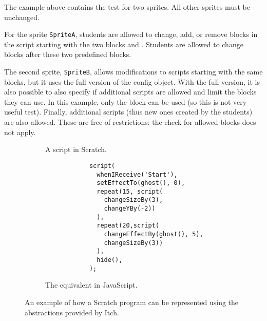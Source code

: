 \documentclass[../main]{subfiles}
\begin{document}
The example above contains the test for two sprites.
All other sprites must be unchanged.

For the sprite \texttt{SpriteA}, students are allowed to change, add, or remove blocks in the script starting with the two blocks  and .
Students are allowed to change blocks after these two predefined blocks.

The second sprite, \texttt{SpriteB}, allows modifications to scripts starting with the same blocks, but it uses the full version of the config object.
With the full version, it is also possible to also specify if additional scripts are allowed and limit the blocks they can use.
In this example, only the  block can be used (so this is not very useful test).
Finally, additional scripts (thus new ones created by the students) are also allowed.
These are free of restrictions: the check for allowed blocks does not apply.

\begin{figure}
    \centering
    \begin{wide}
        \begin{subfigure}{0.49\linewidth}
            \begin{scratch}[scale=0.8]
                {
                }
                {
                }

            \end{scratch}
            \caption{A script in Scratch.}
        \end{subfigure}
        \begin{subfigure}{0.5\linewidth}
            \begin{verbatim}
            script(
              whenIReceive('Start'),
              setEffectTo(ghost(), 0),
              repeat(15, script(
                changeSizeBy(3),
                changeYBy(-2))
              ),
              repeat(20,script(
                changeEffectBy(ghost(), 5),
                changeSizeBy(3))
              ),
              hide(),
            );
            \end{verbatim}
            \caption{The equivalent in JavaScript.}
        \end{subfigure}
    \end{wide}
    \caption{An example of how a Scratch program can be represented using the abstractions provided by Itch.}\label{fig:itch-block-abstraction}
\end{figure}
\end{document}
